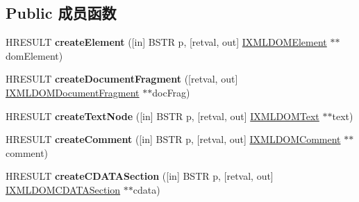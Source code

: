 \subsection*{Public 成员函数}
\begin{DoxyCompactItemize}
\item 
\mbox{\label{interface_m_s_x_m_l2_1_1_i_x_m_l_d_o_m_document_aa63b6edfa8b6bb4ab271d7db04da8f37}} 
H\+R\+E\+S\+U\+LT {\bfseries create\+Element} (\mbox{[}in\mbox{]} B\+S\+TR p, \mbox{[}retval, out\mbox{]} \hyperlink{interface_m_s_x_m_l2_1_1_i_x_m_l_d_o_m_element}{I\+X\+M\+L\+D\+O\+M\+Element} $\ast$$\ast$dom\+Element)
\item 
\mbox{\label{interface_m_s_x_m_l2_1_1_i_x_m_l_d_o_m_document_a083c503c47aa36f6414bed9f76138272}} 
H\+R\+E\+S\+U\+LT {\bfseries create\+Document\+Fragment} (\mbox{[}retval, out\mbox{]} \hyperlink{interface_m_s_x_m_l2_1_1_i_x_m_l_d_o_m_document_fragment}{I\+X\+M\+L\+D\+O\+M\+Document\+Fragment} $\ast$$\ast$doc\+Frag)
\item 
\mbox{\label{interface_m_s_x_m_l2_1_1_i_x_m_l_d_o_m_document_ac4424718d50e4d0721b1f1a271591a87}} 
H\+R\+E\+S\+U\+LT {\bfseries create\+Text\+Node} (\mbox{[}in\mbox{]} B\+S\+TR p, \mbox{[}retval, out\mbox{]} \hyperlink{interface_m_s_x_m_l2_1_1_i_x_m_l_d_o_m_text}{I\+X\+M\+L\+D\+O\+M\+Text} $\ast$$\ast$text)
\item 
\mbox{\label{interface_m_s_x_m_l2_1_1_i_x_m_l_d_o_m_document_ad999e03cc035339b43c70ee55877a536}} 
H\+R\+E\+S\+U\+LT {\bfseries create\+Comment} (\mbox{[}in\mbox{]} B\+S\+TR p, \mbox{[}retval, out\mbox{]} \hyperlink{interface_m_s_x_m_l2_1_1_i_x_m_l_d_o_m_comment}{I\+X\+M\+L\+D\+O\+M\+Comment} $\ast$$\ast$comment)
\item 
\mbox{\label{interface_m_s_x_m_l2_1_1_i_x_m_l_d_o_m_document_a4c3f3fd68e389ad8d831ea4e7c33e123}} 
H\+R\+E\+S\+U\+LT {\bfseries create\+C\+D\+A\+T\+A\+Section} (\mbox{[}in\mbox{]} B\+S\+TR p, \mbox{[}retval, out\mbox{]} \hyperlink{interface_m_s_x_m_l2_1_1_i_x_m_l_d_o_m_c_d_a_t_a_section}{I\+X\+M\+L\+D\+O\+M\+C\+D\+A\+T\+A\+Section} $\ast$$\ast$cdata)
\item 
$$
\end{DoxyCompactItemize}
